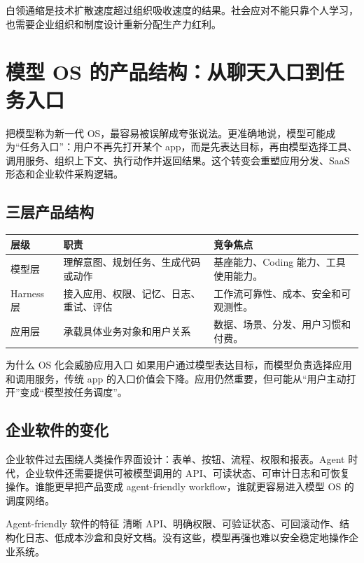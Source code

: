 \documentclass[a4paper]{article}
\begin{document}
白领通缩是技术扩散速度超过组织吸收速度的结果。社会应对不能只靠个人学习，也需要企业组织和制度设计重新分配生产力红利。


\section{模型 OS 的产品结构：从聊天入口到任务入口}

把模型称为新一代 OS，最容易被误解成夸张说法。更准确地说，模型可能成为“任务入口”：用户不再先打开某个 app，而是先表达目标，再由模型选择工具、调用服务、组织上下文、执行动作并返回结果。这个转变会重塑应用分发、SaaS 形态和企业软件采购逻辑。

\subsection{三层产品结构}

\noindent\begin{longtable}{p{}p{}p{}}
\toprule
层级 & 职责 & 竞争焦点 \\
\midrule
模型层 & 理解意图、规划任务、生成代码或动作 & 基座能力、Coding 能力、工具使用能力。 \\
Harness 层 & 接入应用、权限、记忆、日志、重试、评估 & 工作流可靠性、成本、安全和可观测性。 \\
应用层 & 承载具体业务对象和用户关系 & 数据、场景、分发、用户习惯和付费。 \\
\bottomrule
\end{longtable}

\begin{knowledgebox}{为什么 OS 化会威胁应用入口}
如果用户通过模型表达目标，而模型负责选择应用和调用服务，传统 app 的入口价值会下降。应用仍然重要，但可能从“用户主动打开”变成“模型按任务调度”。
\end{knowledgebox}

\subsection{企业软件的变化}

企业软件过去围绕人类操作界面设计：表单、按钮、流程、权限和报表。Agent 时代，企业软件还需要提供可被模型调用的 API、可读状态、可审计日志和可恢复操作。谁能更早把产品变成 agent-friendly workflow，谁就更容易进入模型 OS 的调度网络。

\begin{importantbox}{Agent-friendly 软件的特征}
清晰 API、明确权限、可验证状态、可回滚动作、结构化日志、低成本沙盒和良好文档。没有这些，模型再强也难以安全稳定地操作企业系统。
\end{importantbox}
\end{document}
